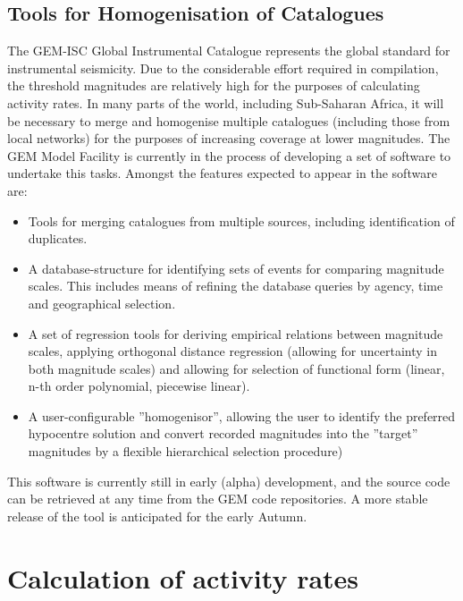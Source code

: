 \subsection{Tools for Homogenisation of Catalogues}

The GEM-ISC Global Instrumental Catalogue represents the global standard for instrumental seismicity. Due to the considerable effort required in compilation, the threshold magnitudes are relatively high for the purposes of calculating activity rates. In many parts of the world, including Sub-Saharan Africa, it will be necessary to merge and homogenise multiple catalogues (including those from local networks) for the purposes of increasing coverage at lower magnitudes. The GEM Model Facility is currently in the process of developing a set of software to undertake this tasks. Amongst the features expected to appear in the software are:

\begin{itemize}
\item Tools for merging catalogues from multiple sources, including identification of duplicates.
\item A database-structure for identifying sets of events for comparing magnitude scales. This includes means of refining the database queries by agency, time and geographical selection.
\item A set of regression tools for deriving empirical relations between magnitude scales, applying orthogonal distance regression (allowing for uncertainty in both magnitude scales) and allowing for selection of functional form (linear, n-th order polynomial, piecewise linear).
\item A user-configurable ''homogenisor'', allowing the user to identify the preferred hypocentre solution and convert recorded magnitudes into the ''target'' magnitudes by a flexible hierarchical selection procedure)
\end{itemize}

This software is currently still in early (alpha) development, and the source code can be retrieved at any time from the GEM code repositories. A more stable release of the tool is anticipated for the early Autumn.   


\section{Calculation of activity rates}

